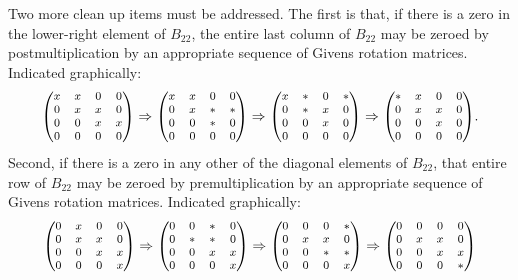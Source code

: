 Two more clean up items must be addressed.  The first is that, if there is a zero in the lower-right element of $B_{22}$, the entire last column of $B_{22}$ may
be zeroed by postmultiplication by an appropriate sequence of Givens rotation matrices.  Indicated graphically:
\begin{equation*}
  {\footnotesize\begin{pmatrix} x & x & 0 & 0 \\ 0 & x & x & 0 \\ 0 & 0 & x & x \\ 0 & 0 & 0 & 0 \end{pmatrix}} \Rightarrow
  {\footnotesize\begin{pmatrix} x & x & 0 & 0 \\ 0 & x & * & * \\ 0 & 0 & * & 0 \\ 0 & 0 & 0 & 0 \end{pmatrix}} \Rightarrow
  {\footnotesize\begin{pmatrix} x & * & 0 & * \\ 0 & * & x & 0 \\ 0 & 0 & x & 0 \\ 0 & 0 & 0 & 0 \end{pmatrix}} \Rightarrow
  {\footnotesize\begin{pmatrix} * & x & 0 & 0 \\ 0 & x & x & 0 \\ 0 & 0 & x & 0 \\ 0 & 0 & 0 & 0 \end{pmatrix}}.
\end{equation*}
Second, if there is a zero in any other of the diagonal elements of $B_{22}$, that entire row of $B_{22}$ may
be zeroed by premultiplication by an appropriate sequence of Givens rotation matrices.  Indicated graphically:
\begin{equation*}
  {\footnotesize\begin{pmatrix} 0 & x & 0 & 0 \\ 0 & x & x & 0 \\ 0 & 0 & x & x \\ 0 & 0 & 0 & x \end{pmatrix}} \Rightarrow
  {\footnotesize\begin{pmatrix} 0 & 0 & * & 0 \\ 0 & * & * & 0 \\ 0 & 0 & x & x \\ 0 & 0 & 0 & x \end{pmatrix}} \Rightarrow
  {\footnotesize\begin{pmatrix} 0 & 0 & 0 & * \\ 0 & x & x & 0 \\ 0 & 0 & * & * \\ 0 & 0 & 0 & x \end{pmatrix}} \Rightarrow
  {\footnotesize\begin{pmatrix} 0 & 0 & 0 & 0 \\ 0 & x & x & 0 \\ 0 & 0 & x & x \\ 0 & 0 & 0 & * \end{pmatrix}}
\end{equation*}
